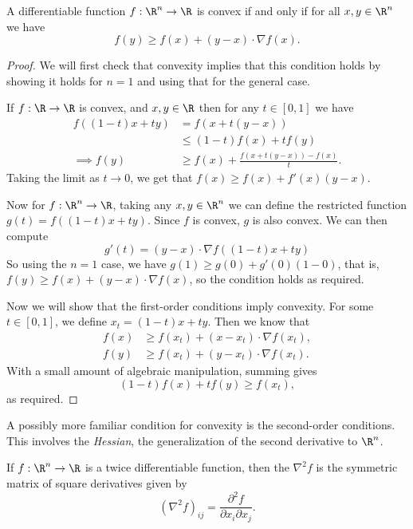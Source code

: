 \documentclass[a4paper]{article}
\begin{document}
\begin{proposition}
A differentiable function $f: \R^n \rightarrow \R$ is convex if and only if for all $x, y \in \R^n$ we have
$$
f(y) \geq f(x) + (y - x) \cdot \nabla f(x).
$$
\end{proposition}
\begin{proof}
    We will first check that convexity implies that this condition holds by showing it holds for $n = 1$ and using that for the general case. 

    If $f: \R \rightarrow \R$ is convex, and $x, y \in \R$ then for any $t \in [0, 1]$ we have
    \begin{align*}
        f((1 - t)x + ty) &= f(x + t(y - x)) \\
        & \leq (1 - t)f(x) + tf(y) \\
\implies f(y) & \geq f(x) + \frac{f(x + t(y - x)) - f(x)}{t}.
    \end{align*}
    Taking the limit as $t \rightarrow 0$, we get that $f(x) \geq f(x) + f'(x)(y - x)$.

    Now for $f: \R^n \rightarrow \R$, taking any $x, y \in \R^n$ we can define the restricted function $g(t) = f((1 - t)x + ty)$. Since $f$ is convex, $g$ is also convex. We can then compute
    $$
    g'(t) = (y - x) \cdot \nabla f((1 - t) x + ty)
    $$
    So using the $n = 1$ case, we have $g(1) \geq g(0) + g'(0) (1 - 0)$, that is, $f(y) \geq f(x) + (y - x) \cdot \nabla f(x)$, so the condition holds as required.

    Now we will show that the first-order conditions imply convexity.
    For some $t \in [0, 1]$, we define $x_t = (1 - t) x + ty$. Then we know that
    \begin{align*}
        f(x) &\geq f(x_t) + (x - x_t) \cdot \nabla f(x_t), \\
        f(y) &\geq f(x_t) + (y - x_t) \cdot \nabla f(x_t).
    \end{align*}    
    With a small amount of algebraic manipulation, summing gives 
    $$
    (1 - t)f(x) + tf(y) \geq f(x_t),
    $$
    as required.
\end{proof}

A possibly more familiar condition for convexity is the second-order conditions. This involves the \emph{Hessian}, the generalization of the second derivative to $\R^n$.

\begin{definition}[Hessian]
    If $f: \R^n \rightarrow \R$ is a twice differentiable function, then the  $\nabla^2 f$ is the symmetric matrix of square derivatives given by
    $$
    (\nabla^2 f)_{ij} = \frac{\partial^2 f}{\partial x_i \partial x_j}.
    $$
\end{definition}
\end{document}
